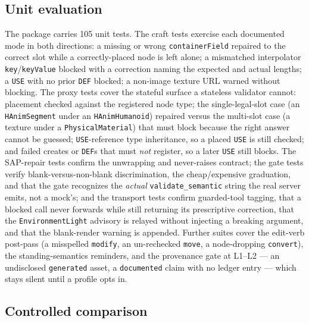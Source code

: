 \documentclass[sigconf,nonacm,screen,anonymous]{acmart}
\begin{document}
\subsection{Unit evaluation}

The package carries 105 unit tests. The craft tests exercise each documented mode in both directions: a missing or wrong \texttt{containerField} repaired to the correct slot while a correctly-placed node is left alone; a mismatched interpolator \texttt{key}/\texttt{keyValue} blocked with a correction naming the expected and actual lengths; a \texttt{USE} with no prior \texttt{DEF} blocked; a non-image texture URL warned without blocking. The proxy tests cover the stateful surface a stateless validator cannot: placement checked against the registered node type; the single-legal-slot case (an \texttt{HAnimSegment} under an \texttt{HAnimHumanoid}) repaired versus the multi-slot case (a texture under a \texttt{PhysicalMaterial}) that must block because the right answer cannot be guessed; \texttt{USE}-reference type inheritance, so a placed \texttt{USE} is still checked; and failed creates or \texttt{DEF}s that must \emph{not} register, so a later \texttt{USE} still blocks. The SAP-repair tests confirm the unwrapping and never-raises contract; the gate tests verify blank-versus-non-blank discrimination, the cheap/expensive graduation, and that the gate recognizes the \emph{actual} \texttt{validate\_semantic} string the real server emits, not a mock's; and the transport tests confirm guarded-tool tagging, that a blocked call never forwards while still returning its prescriptive correction, that the \texttt{EnvironmentLight} advisory is relayed without injecting a breaking argument, and that the blank-render warning is appended. Further suites cover the edit-verb post-pass (a misspelled \texttt{modify}, an un-rechecked \texttt{move}, a node-dropping \texttt{convert}), the standing-semantics reminders, and the provenance gate at L1--L2 --- an undisclosed \texttt{generated} asset, a \texttt{documented} claim with no ledger entry --- which stays silent until a profile opts in.

\subsection{Controlled comparison}
\end{document}
